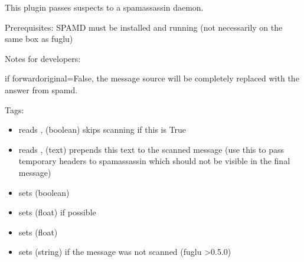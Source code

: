 \documentclass[letterpaper,10pt,english]{sphinxmanual}
\begin{document}
This plugin passes suspects to a spamassassin daemon.

Prerequisites: SPAMD must be installed and running (not necessarily on the same box as fuglu)

Notes for developers:

if forwardoriginal=False, the message source will be completely replaced with the answer from spamd.

Tags:
\begin{itemize}
\item {} 
reads , (boolean) skips scanning if this is True

\item {} 
reads , (text) prepends this text to the scanned message (use this to pass temporary headers to spamassassin which should not be visible in the final message)

\item {} 
sets  (boolean)

\item {} 
sets  (float) if possible

\item {} 
sets  (float)

\item {} 
sets  (string) if the message was not scanned (fuglu \textgreater{}0.5.0)

\end{itemize}
\end{document}
